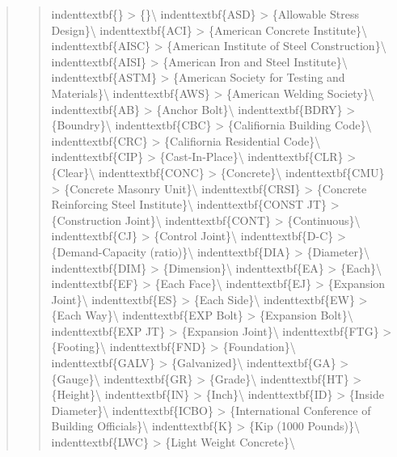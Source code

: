 \documentclass[12pt,notitle,letterpaper]{report}
\begin{document}
\begin{quote}
\begin{quote}
indenttextbf\{\}         >  \{\}\textbackslash{}
indenttextbf\{ASD\}      >  \{Allowable Stress Design\}\textbackslash{}
indenttextbf\{ACI\}      >  \{American Concrete Institute\}\textbackslash{}
indenttextbf\{AISC\}     >  \{American Institute of Steel Construction\}\textbackslash{}
indenttextbf\{AISI\}     >  \{American Iron and Steel Institute\}\textbackslash{}
indenttextbf\{ASTM\}     >  \{American Society for Testing and Materials\}\textbackslash{}
indenttextbf\{AWS\}      >  \{American Welding Society\}\textbackslash{}
indenttextbf\{AB\}       >  \{Anchor Bolt\}\textbackslash{}
indenttextbf\{BDRY\}     >  \{Boundry\}\textbackslash{}
indenttextbf\{CBC\}      >  \{Califiornia Building Code\}\textbackslash{}
indenttextbf\{CRC\}      >  \{Califiornia Residential Code\}\textbackslash{}
indenttextbf\{CIP\}      >  \{Cast-In-Place\}\textbackslash{}
indenttextbf\{CLR\}      >  \{Clear\}\textbackslash{}
indenttextbf\{CONC\}     >  \{Concrete\}\textbackslash{}
indenttextbf\{CMU\}      >  \{Concrete Masonry Unit\}\textbackslash{}
indenttextbf\{CRSI\}     >  \{Concrete Reinforcing Steel Institute\}\textbackslash{}
indenttextbf\{CONST JT\} >  \{Construction Joint\}\textbackslash{}
indenttextbf\{CONT\}     >  \{Continuous\}\textbackslash{}
indenttextbf\{CJ\}       >  \{Control Joint\}\textbackslash{}
indenttextbf\{D-C\}      >  \{Demand-Capacity (ratio)\}\textbackslash{}
indenttextbf\{DIA\}      >  \{Diameter\}\textbackslash{}
indenttextbf\{DIM\}      >  \{Dimension\}\textbackslash{}
indenttextbf\{EA\}       >  \{Each\}\textbackslash{}
indenttextbf\{EF\}       >  \{Each Face\}\textbackslash{}
indenttextbf\{EJ\}       >  \{Expansion Joint\}\textbackslash{}
indenttextbf\{ES\}       >  \{Each Side\}\textbackslash{}
indenttextbf\{EW\}       >  \{Each Way\}\textbackslash{}
indenttextbf\{EXP Bolt\} >  \{Expansion Bolt\}\textbackslash{}
indenttextbf\{EXP JT\}   >  \{Expansion Joint\}\textbackslash{}
indenttextbf\{FTG\}      >  \{Footing\}\textbackslash{}
indenttextbf\{FND\}      >  \{Foundation\}\textbackslash{}
indenttextbf\{GALV\}     >  \{Galvanized\}\textbackslash{}
indenttextbf\{GA\}       >  \{Gauge\}\textbackslash{}
indenttextbf\{GR\}       >  \{Grade\}\textbackslash{}
indenttextbf\{HT\}       >  \{Height\}\textbackslash{}
indenttextbf\{IN\}       >  \{Inch\}\textbackslash{}
indenttextbf\{ID\}       >  \{Inside Diameter\}\textbackslash{}
indenttextbf\{ICBO\}     >  \{International Conference of Building Officials\}\textbackslash{}
indenttextbf\{K\}        >  \{Kip (1000 Pounds)\}\textbackslash{}
indenttextbf\{LWC\}      >  \{Light Weight Concrete\}\textbackslash{}

\end{quote}
\end{quote}
\end{document}
